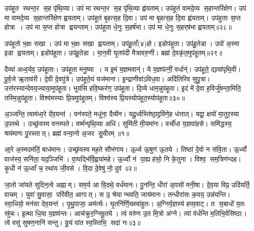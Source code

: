 उप॑हूत रथन्त॒र स॒ह पृ॑थि॒व्या।
उप॑ मा रथन्त॒र स॒ह पृ॑थि॒व्या ह्व॑यताम्।
उप॑हूतं वामदे॒व्य स॒हान्तरि॑क्षेण।
उप॑ मा वामदे॒व्य स॒हान्तरि॑क्षेण ह्वयताम्।
उप॑हूतं बृ॒हत्स॒ह दि॒वा।
उप॑ मा बृ॒हत्स॒ह दि॒वा ह्व॑यताम्।
उप॑हूताः स॒प्त होत्रा।
उप॑ मा स॒प्त होत्रा ह्वयन्ताम्।
उप॑हूता धे॒नुः स॒हर्ष॑भा।
उप॑ मा धे॒नुः स॒हर्‌ष॑भा ह्वयताम्॥२८॥

उप॑हूतो भ॒क्षः सखा।
उप॑ मा भ॒क्षः सखा ह्वयताम्।
उप॑हू॒ताँ(४)हो।
इडोप॑हूता।
उप॑हू॒तेडा।
उपो॑ अ॒स्मा इडा ह्वयताम्।
इडोप॑हूता।
उप॑हू॒तेडा।
मा॒न॒वी घृ॒तप॑दी मैत्रावरु॒णी।
ब्रह्म॑ दे॒वकृ॑त॒मुप॑हूतम्॥२९॥

दैव्या॑ अध्व॒र्यव॒ उप॑हूताः।
उप॑हूता मनु॒ष्या।
य इ॒मं य॒ज्ञमवान्॑।
ये य॒ज्ञप॑त्नीं॒ वर्धान्॑।
उप॑हूते॒ द्यावा॑पृथि॒वी।
पू॒र्व॒जे ऋ॒ताव॑री।
दे॒वी दे॒वपु॑त्रे।
उप॑हूते॒यं यज॑माना।
इ॒न्द्राणीवा॑ऽविध॒वा।
अदि॑तिरिव सुपु॒त्रा।
उत्त॑रस्यान्देवय॒ज्याया॒मुप॑हूता।
भूय॑सि हवि॒ष्कर॑ण॒ उप॑हूता।
दि॒व्ये धाम॒न्नुप॑हूता।
इ॒दं मे॑ दे॒वा ह॒विर्जु॑षन्ता॒मिति॒ तस्मि॒न्नुप॑हूता।
विश्व॑मस्याः प्रि॒यमुप॑हूतम्।
विश्व॑स्य प्रि॒यस्योप॑हूत॒स्योप॑हूता॥३०॥




\clearpage
{}
\setcounter{anuvakam}{0}

अ॒ञ्जन्ति॒ त्वाम॑ध्व॒रे दे॑व॒यन्त॑।
वन॑स्पते॒ मधु॑ना॒ दैव्ये॑न।
यदू॒र्ध्वस्ति॑ष्ठा॒द्द्रवि॑णे॒ह ध॑त्तात्।
यद्वा॒ क्षयो॑ मा॒तुर॒स्या उ॒पस्थे।
उच्छ्र॑यस्व वनस्पते।
वर्ष्म॑न्पृथि॒व्या अधि॑।
सुमि॑ती मी॒यमा॑नः।
वर्चो॑धा य॒ज्ञवा॑हसे।
समि॑द्धस्य॒ श्रय॑माणः पु॒रस्तात्।
ब्रह्म॑ वन्वा॒नो अ॒जर सु॒वीरम्॥१॥

आ॒रे अ॒स्मदम॑तिं॒ बाध॑मानः।
उच्छ्र॑यस्व मह॒ते सौभ॑गाय।
ऊ॒र्ध्व ऊ॒षुण॑ ऊ॒तये।
तिष्ठा॑ दे॒वो न स॑वि॒ता।
ऊ॒र्ध्वो वाज॑स्य॒ सनि॑ता॒ यद॒ञ्जिभि॑।
वा॒घद्भि॑र्वि॒ह्वया॑महे।
ऊ॒र्ध्वो न॑ पा॒ह्यह॑सो॒ नि के॒तुना।
विश्व॒ सम॒त्रिण॑न्दह।
कृ॒धी न॑ ऊ॒र्ध्वां च॒ रथा॑य जी॒वसे।
वि॒दा दे॒वेषु॑ नो॒ दुव॑॥२॥

जा॒तो जा॑यते सुदिन॒त्वे अह्नाम्।
सम॒र्य आ वि॒दथे॒ वर्ध॑मानः।
पु॒नन्ति॒ धीरा॑ अ॒पसो॑ मनी॒षा।
दे॒व॒या विप्र॒ उदि॑यर्ति॒ वाचम्।
युवा॑ सु॒वासा॒ परि॑वीत॒ आगात्।
स उ॒ श्रेयान्भवति॒ जाय॑मानः।
तन्धीरा॑सः क॒वय॒ उन्न॑यन्ति।
स्वा॒धियो॒ मन॑सा देव॒यन्त॑।
पृ॒थु॒पाजा॒ अम॑र्त्यः।
घृ॒तनि॑र्णि॒ख्स्वा॑हुतः।
अ॒ग्निर्य॒ज्ञस्य॑ हव्य॒वाट्।
त स॒बाधो॑ य॒तः स्रु॑चः।
इ॒त्था धि॒या य॒ज्ञव॑न्तः।
आच॑क्रुर॒ग्निमू॒तये।
त्वं वरु॑ण उ॒त मि॒त्रो अ॑ग्ने।
त्वां व॑र्धन्ति म॒तिभि॒र्वसि॑ष्ठाः।
त्वे वसु॑ सुषण॒नानि॑ सन्तु।
यू॒यं पा॑त स्व॒स्तिभि॒ सदा॑ नः॥३॥\anuvakamend[सु॒वीर॒न्दुव॒ स्वा॑हुतो॒ऽष्टौ च॑]


